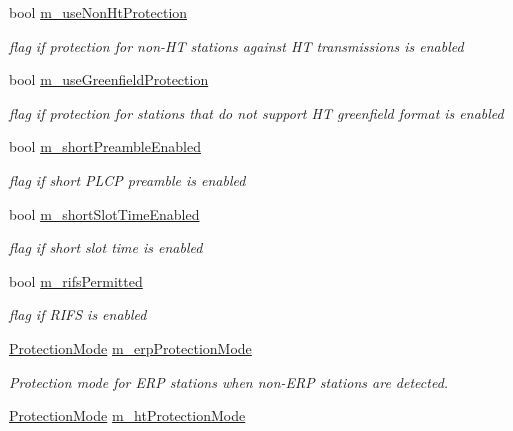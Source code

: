 \begin{DoxyCompactItemize}
bool \hyperlink{classns3_1_1WifiRemoteStationManager_a4205e24475f15413af70fb8225044525}{m\+\_\+use\+Non\+Ht\+Protection}
\begin{DoxyCompactList}\small\item\em flag if protection for non-\/\+HT stations against HT transmissions is enabled \end{DoxyCompactList}\item 
bool \hyperlink{classns3_1_1WifiRemoteStationManager_ad6adddbb6f117ffda3624f49e358b9d6}{m\+\_\+use\+Greenfield\+Protection}
\begin{DoxyCompactList}\small\item\em flag if protection for stations that do not support HT greenfield format is enabled \end{DoxyCompactList}\item 
bool \hyperlink{classns3_1_1WifiRemoteStationManager_a5ebcf6e811883086c9045da5244eecc1}{m\+\_\+short\+Preamble\+Enabled}
\begin{DoxyCompactList}\small\item\em flag if short P\+L\+CP preamble is enabled \end{DoxyCompactList}\item 
bool \hyperlink{classns3_1_1WifiRemoteStationManager_af90482586cdcd542db15734d14195cd6}{m\+\_\+short\+Slot\+Time\+Enabled}
\begin{DoxyCompactList}\small\item\em flag if short slot time is enabled \end{DoxyCompactList}\item 
bool \hyperlink{classns3_1_1WifiRemoteStationManager_aeed6724cf6898307008495f00a14279b}{m\+\_\+rifs\+Permitted}
\begin{DoxyCompactList}\small\item\em flag if R\+I\+FS is enabled \end{DoxyCompactList}\item 
\hyperlink{classns3_1_1WifiRemoteStationManager_acd7d97851233efb176637f24b3f8abd6}{Protection\+Mode} \hyperlink{classns3_1_1WifiRemoteStationManager_acc0e4f606a7226059ff0e2e7c74024bc}{m\+\_\+erp\+Protection\+Mode}
\begin{DoxyCompactList}\small\item\em Protection mode for E\+RP stations when non-\/\+E\+RP stations are detected. \end{DoxyCompactList}\item 
\hyperlink{classns3_1_1WifiRemoteStationManager_acd7d97851233efb176637f24b3f8abd6}{Protection\+Mode} \hyperlink{classns3_1_1WifiRemoteStationManager_a1a4afefd1dd2f335ef6b44c3619073cd}{m\+\_\+ht\+Protection\+Mode}

\end{DoxyCompactItemize}
